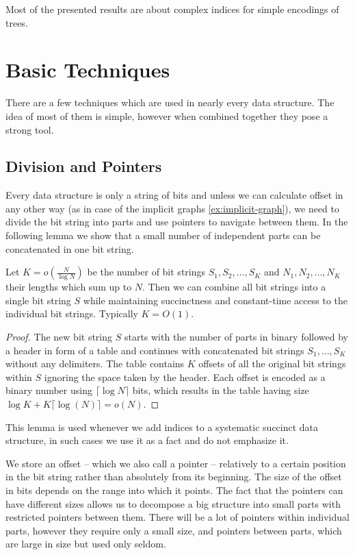 \bigbreak

Most of the presented results are about complex indices for simple encodings of trees.

\section{Basic Techniques}

There are a few techniques which are used in nearly every data structure.
The idea of most of them is simple, however when combined together they pose a strong tool.

\subsection{Division and Pointers}

Every data structure is only a string of bits and unless we can calculate offset in any other way (as in case of the implicit graphs \ref{ex:implicit-graph}), we need to divide the bit string into parts and use pointers to navigate between them.
In the following lemma we show that a small number of independent parts can be concatenated in one bit string.

\begin{lemma}\label{l:concat}
	Let $K = o(\frac{N}{\log N})$ be the number of bit strings $S_1, S_2, \ldots, S_K$ and $N_1, N_2, \dots, N_K$ their lengths which sum up to $N$.
	Then we can combine all bit strings into a single bit string $S$ while maintaining succinctness and constant-time access to the individual bit strings.
	Typically $K = O(1)$.
\end{lemma}
\begin{proof}
	The new bit string $S$ starts with the number of parts in binary followed by a header in form of a table and continues with concatenated bit strings $S_1, \ldots, S_K$ without any delimiters.
	The table contains $K$ offsets of all the original bit strings within $S$ ignoring the space taken by the header.
	Each offset is encoded as a binary number using $\lceil \log N \rceil$ bits, which results in the table having size $\log K + K \lceil \log (N) \rceil = o(N)$.
\end{proof}

This lemma is used whenever we add indices to a systematic succinct data structure, in such cases we use it as a fact and do not emphasize it.

We store an offset -- which we also call a pointer -- relatively to a certain position in the bit string rather than absolutely from its beginning.
The size of the offset in bits depends on the range into which it points.
The fact that the pointers can have different sizes allows us to decompose a big structure into small parts with restricted pointers between them.
There will be a lot of pointers within individual parts, however they require only a small size, and pointers between parts, which are large in size but used only seldom.

